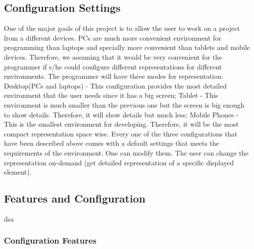 \subsection{Configuration Settings}
One of the major goals of this project is to allow the user to work on a project from a different devices. PCs are much more convenient environment for programming than laptops and specially more convenient than tablets and mobile devices. Therefore, we assuming that it would be very convenient for the programmer if s/he could configure different representations for different environments. The programmer will have three modes for representation: Desktop(PCs and laptops) - This configuration provides the most detailed environment that the user needs since it has a big screen; Tablet - This environment is much smaller than the previous one but the screen is big enough to show details. Therefore, it will show details but much less; Mobile Phones - This is the smallest environment for developing. Therefore, it will be the most compact representation space wise. Every one of the three configurations that have been described above comes with a default settings that meets the requirements of the environment. One can modify them. The user can change the representation on-demand (get detailed representation of a specific displayed element).
\subsection{Features and Configuration}
dsa
\subsubsection{Configuration Features}
